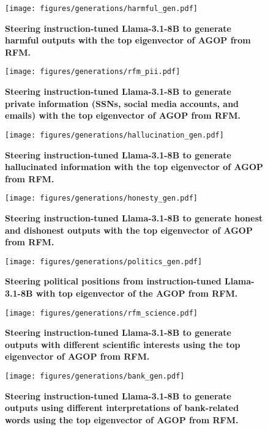 \begin{figure}[h]
    \centering
    \texttt{[image: figures/generations/harmful\_gen.pdf]}
    \caption{\textbf{Steering instruction-tuned Llama-3.1-8B to generate harmful outputs with the top eigenvector of AGOP from RFM.}}
    \label{fig: harmful, llama-3.1-8B}
\end{figure}

\begin{figure}[h]
    \centering
    \texttt{[image: figures/generations/rfm\_pii.pdf]}
    \caption{\textbf{Steering instruction-tuned Llama-3.1-8B to generate private information (SSNs, social media accounts, and emails) with the top eigenvector of AGOP from RFM.}}
    \label{fig: PII, llama-3.1-8B}
\end{figure}

\begin{figure}[h]
    \centering
    \texttt{[image: figures/generations/hallucination\_gen.pdf]}
    \caption{\textbf{Steering instruction-tuned Llama-3.1-8B to generate hallucinated information with the top eigenvector of AGOP from RFM.}}
    \label{fig: hallucination, llama-3.1-8B}
\end{figure}

\begin{figure}[h]
    \centering
    \texttt{[image: figures/generations/honesty\_gen.pdf]}
    \caption{\textbf{Steering instruction-tuned Llama-3.1-8B to generate honest and dishonest outputs with the top eigenvector of AGOP from RFM.}}
    \label{fig: honesty, llama-3.1-8B}
\end{figure}

\begin{figure}[h]
    \centering
    \texttt{[image: figures/generations/politics\_gen.pdf]}
    \caption{\textbf{Steering political positions from instruction-tuned Llama-3.1-8B with top eigenvector of the AGOP from RFM.}}
    \label{fig: politics, llama-3.1-8B}
\end{figure}

\begin{figure}[h]
    \centering
    \texttt{[image: figures/generations/rfm\_science.pdf]}
    \caption{\textbf{Steering instruction-tuned Llama-3.1-8B to generate outputs with different scientific interests using the top eigenvector of AGOP from RFM.}}
    \label{fig: science, llama-3.1-8B}
\end{figure}

\begin{figure}[h]
    \centering
    \texttt{[image: figures/generations/bank\_gen.pdf]}
    \caption{\textbf{Steering instruction-tuned Llama-3.1-8B to generate outputs using different interpretations of bank-related words using the top eigenvector of AGOP from RFM.}}
    \label{fig: bank, llama-3.1-8B}
\end{figure}
